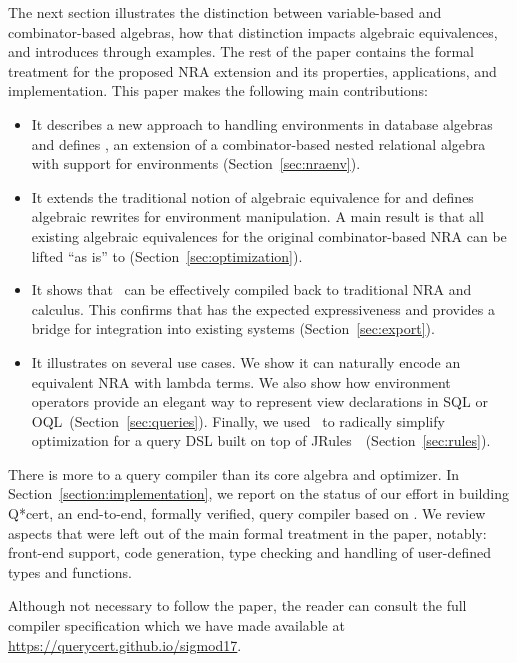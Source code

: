 The next section illustrates the distinction between variable-based
and combinator-based algebras, how that distinction impacts algebraic
equivalences, and introduces \NRAEnv through examples. The rest of the
paper contains the formal treatment for the proposed NRA extension and
its properties, applications, and implementation. This paper makes the
following main contributions:
\begin{itemize}
\item It describes a new approach to handling environments in database
  algebras and defines \NRAEnv, an extension of a combinator-based
  nested relational algebra with support for environments
  (Section~\ref{sec:nraenv}).
\item It extends the traditional notion of algebraic equivalence for
  \NRAEnv and defines algebraic rewrites for environment
  manipulation. A main result is that all existing algebraic
  equivalences for the original combinator-based NRA can be lifted
  ``as is'' to \NRAEnv (Section~\ref{sec:optimization}).
\item It shows that \NRAEnv\ can be effectively compiled back to
  traditional NRA and calculus. This confirms that \NRAEnv has the
  expected expressiveness and provides a bridge for integration into
  existing systems (Section~\ref{sec:export}).
\item It illustrates \NRAEnv on several use cases. We show it can
  naturally encode an equivalent NRA with lambda terms. We also show
  how environment operators provide an elegant way to represent view
  declarations in SQL or OQL~(Section~\ref{sec:queries}). Finally, we
  used \NRAEnv\ to radically simplify optimization for a query DSL
  built on top of JRules~\cite{jrules-book}~(Section~\ref{sec:rules}).
\end{itemize}

There is more to a query compiler than its core algebra and
optimizer. In Section~\ref{section:implementation}, we report on the
status of our effort in building Q*cert, an end-to-end, formally
verified, query compiler based on \NRAEnv. We review aspects that were
left out of the main formal treatment in the paper, notably: front-end
support, code generation, type checking and handling of user-defined
types and functions.

Although not necessary to follow the paper, the reader can consult the
full compiler specification which we have made available at
\url{https://querycert.github.io/sigmod17}.
%


